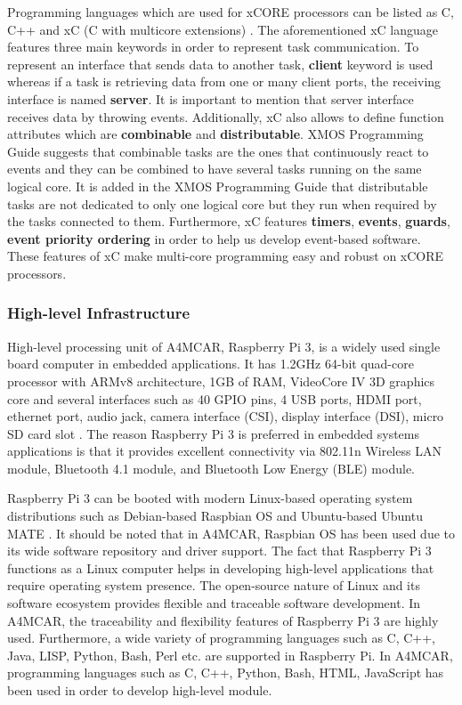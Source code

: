 Programming languages which are used for xCORE processors can be listed as C, C++ and xC (C with multicore extensions) \cite{xmosdatasheet}. The aforementioned xC language features three main keywords in order to represent task communication. To represent an interface that sends data to another task, \textbf{client} keyword is used whereas if a task is retrieving data from one or many client ports, the receiving interface is named \textbf{server}. It is important to mention that server interface receives data by throwing events. Additionally, xC also allows to define function attributes which are \textbf{combinable} and \textbf{distributable}. XMOS Programming Guide \cite{xmosprogrguide} suggests that combinable tasks are the ones that continuously react to events and they can be combined to have several tasks running on the same logical core. It is added in the XMOS Programming Guide \cite{xmosprogrguide} that distributable tasks are not dedicated to only one logical core but they run when required by the tasks connected to them. Furthermore, xC features \textbf{timers}, \textbf{events}, \textbf{guards}, \textbf{event priority ordering} in order to help us develop event-based software. These features of xC make multi-core programming easy and robust on xCORE processors.

\subsubsection{High-level Infrastructure} \label{hlinfrasection}
High-level processing unit of A4MCAR, Raspberry Pi 3, is a widely used single board computer in embedded applications. It has 1.2GHz 64-bit quad-core processor with ARMv8 architecture, 1GB of RAM, VideoCore IV 3D graphics core and several interfaces such as 40 GPIO pins, 4 USB ports, HDMI port, ethernet port, audio jack, camera interface (CSI), display interface (DSI), micro SD card slot \cite{raspberrypiinfo}. The reason Raspberry Pi 3 is preferred in embedded systems applications is that it provides excellent connectivity via 802.11n Wireless LAN module, Bluetooth 4.1 module, and Bluetooth Low Energy (BLE) module. 

Raspberry Pi 3 can be booted with modern Linux-based operating system distributions such as Debian-based Raspbian OS \cite{raspbiandownload} and Ubuntu-based Ubuntu MATE\cite{ubuntumatedownload} \cite{raspberrypiinfo}. It should be noted that in A4MCAR, Raspbian OS has been used due to its wide software repository and driver support. The fact that Raspberry Pi 3 functions as a Linux computer helps in developing high-level applications that require operating system presence. The open-source nature of Linux and its software ecosystem provides flexible and traceable software development. In A4MCAR, the traceability and flexibility features of Raspberry Pi 3 are highly used. Furthermore, a wide variety of programming languages such as C, C++, Java, LISP, Python, Bash, Perl etc. are supported in Raspberry Pi. In A4MCAR, programming languages such as C, C++, Python, Bash, HTML, JavaScript has been used in order to develop high-level module.


